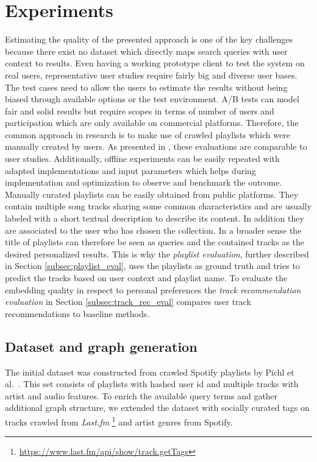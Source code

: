 \documentclass[sigconf]{acmart}
\begin{document}
\section{Experiments}
\label{sec:experiments}
Estimating the quality of the presented approach is one of the key challenges because there exist no dataset which directly maps search queries with user context to results. Even having a working prototype client to test the system on real users, representative user studies require fairly big and diverse user bases. The test cases need to allow the users to estimate the results without being biased through available options or the test environment. A/B tests can model fair and solid results but require scopes in terms of number of users and participation which are only available on commercial platforms. Therefore, the common approach in research is to make use of crawled playlists which were manually created by users. As presented in \cite{kamehkhosh2017user}, these evaluations are comparable to user studies. Additionally, offline experiments can be easily repeated with adapted implementations and input parameters which helps during implementation and optimization to observe and benchmark the outcome. \\

Manually curated playlists can be easily obtained from public platforms. They contain multiple song tracks sharing some common characteristics and are usually labeled with a short textual description to describe its content. In addition they are associated to the user who has chosen the collection. In a broader sense the title of playlists can therefore be seen as queries and the contained tracks as the desired personalized results.
This is why the \emph{playlist evaluation}, further described in Section \ref{subsec:playlist_eval}, uses the playlists as ground truth and tries to predict the tracks based on user context and playlist name. To evaluate the embedding quality in respect to personal preferences the \emph{track recommendation evaluation} in Section \ref{subsec:track_rec_eval} compares user track recommendations to baseline methods.


\subsection{Dataset and graph generation}
The initial dataset was constructed from crawled Spotify playlists by Pichl et al.~\cite{pichl2017improving}. This set consists of playlists with hashed user id and multiple tracks with artist and audio features. To enrich the available query terms and gather additional graph structure, we extended the dataset with socially curated tags on tracks crawled from \emph{Last.fm} \footnote{\url{https://www.last.fm/api/show/track.getTags}} and artist genres from Spotify.
\end{document}
